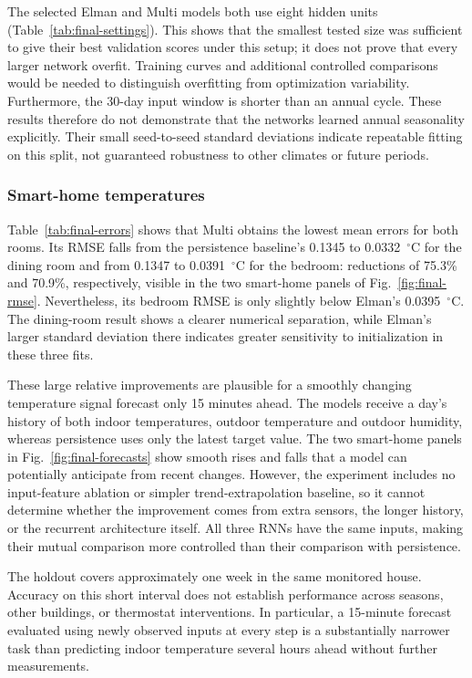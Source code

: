 The selected Elman and Multi models both use eight hidden units
(Table~\ref{tab:final-settings}). This shows that the smallest tested size was
sufficient to give their best validation scores under this setup; it does not
prove that every larger network overfit. Training curves and additional
controlled comparisons would be needed to distinguish overfitting from
optimization variability. Furthermore, the 30-day input window is shorter than
an annual cycle. These results therefore do not demonstrate that the networks
learned annual seasonality explicitly. Their small seed-to-seed standard
deviations indicate repeatable fitting on this split, not guaranteed robustness
to other climates or future periods.

\subsubsection{Smart-home temperatures}
Table~\ref{tab:final-errors} shows that Multi obtains the lowest mean errors for
both rooms. Its RMSE falls from the persistence baseline's 0.1345 to
0.0332~$^\circ$C for the dining room and from 0.1347 to 0.0391~$^\circ$C for the
bedroom: reductions of 75.3\% and 70.9\%, respectively, visible in the two
smart-home panels of Fig.~\ref{fig:final-rmse}. Nevertheless, its bedroom RMSE
is only slightly below Elman's 0.0395~$^\circ$C. The dining-room result shows a
clearer numerical separation, while Elman's larger standard deviation there
indicates greater sensitivity to initialization in these three fits.

These large relative improvements are plausible for a smoothly changing
temperature signal forecast only 15 minutes ahead. The models receive a day's
history of both indoor temperatures, outdoor temperature and outdoor humidity,
whereas persistence uses only the latest target value. The two smart-home panels
in Fig.~\ref{fig:final-forecasts} show smooth rises and falls that a model can
potentially anticipate from recent changes. However, the experiment includes no
input-feature ablation or simpler trend-extrapolation baseline, so it cannot
determine whether the improvement comes from extra sensors, the longer history,
or the recurrent architecture itself. All three RNNs have the same inputs,
making their mutual comparison more controlled than their comparison with
persistence.

The holdout covers approximately one week in the same monitored house. Accuracy
on this short interval does not establish performance across seasons, other
buildings, or thermostat interventions. In particular, a 15-minute forecast
evaluated using newly observed inputs at every step is a substantially narrower
task than predicting indoor temperature several hours ahead without further
measurements.

